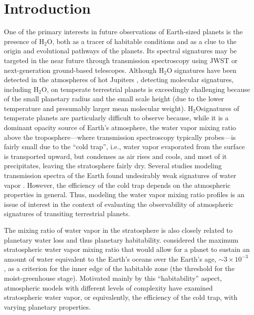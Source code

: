 \documentclass[11pt,numberedappendix,twocolappendix,]{emulateapj}
\def\water{H$_2$O}
\def\wv{water vapor}
\begin{document}



\section{Introduction}
\label{s:intro}

One of the primary interests in future observations of Earth-sized planets is the presence of \water{}, both as a tracer of habitable conditions and as a clue to the origin and evolutional pathways of the planets. 
Its spectral signatures may be targeted in the near future through transmission spectroscopy using JWST or next-generation ground-based telescopes.
%
Although \water{} signatures have been detected in the atmospheres of hot Jupiters \citep[e.g.][]{Sing2016}, detecting molecular signatures, including \water{}, on temperate terrestrial planets is exceedingly challenging \citep{Cowan2015} because of the small planetary radius and the small scale height (due to the lower temperature and presumably larger mean molecular weight).  
\water signatures of temperate planets are particularly difficult to observe because, while it is a dominant opacity source of Earth's atmosphere, the \wv{}  mixing ratio above the troposphere---where transmission spectroscopy typically probes---is fairly small due to the ``cold trap'', i.e., \wv{} evaporated from the surface is transported upward, but condenses as air rises and cools, and most of it precipitates, leaving the stratosphere fairly dry. 
Several studies modeling transmission spectra of the Earth found undesirably weak signatures of \wv{} \citep[e.g.][]{Ehrenreich2006, Kaltenegger2009, Betremieux2013, Misra2014}. 
However, the efficiency of the cold trap depends on the atmospheric properties in general. 
Thus, modeling the \wv{} mixing ratio profiles is an issue of interest in the context of evaluating the observability of atmospheric signatures of transiting terrestrial planets. 

The mixing ratio of \wv{} in the stratosphere is also closely related to planetary water loss and thus planetary habitability. 
\citet{Kasting1993} considered the maximum stratospheric \wv{} mixing ratio that would allow for a planet to sustain an amount of water equivalent to the  Earth's oceans over the Earth's age, $\sim 3 \times 10^{-3}$, as a criterion for the inner edge of the habitable zone (the threshold for the moist-greenhouse stage). 
Motivated mainly by this ``habitability'' aspect, atmospheric models with different levels of complexity have examined stratospheric \wv{}, or equivalently, the efficiency of the cold trap, with varying planetary properties. 
\end{document}
